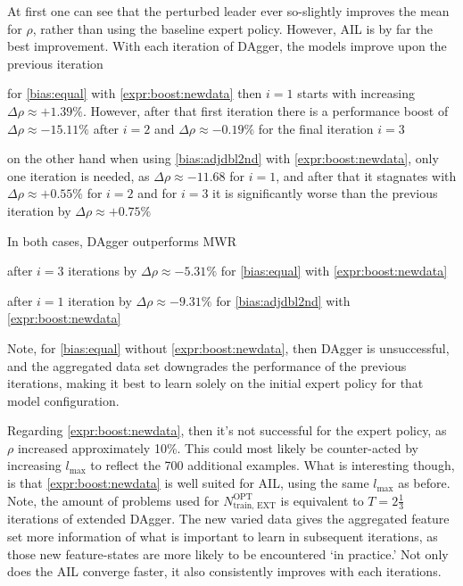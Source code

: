 \documentclass[twocolumn]{svjour3}
\begin{document}
At first one can see that the perturbed leader ever so-slightly improves the 
mean for $\rho$, rather than using the baseline expert policy. 
However, AIL is by far the best improvement. With each iteration of DAgger, the 
models improve upon the previous iteration
\begin{enumerate*} 
    \item for \ref{bias:equal} with \ref{expr:boost:newdata} then $i=1$ starts 
    with increasing $\Delta\rho\approx+1.39\%$. However, after that first  
    iteration there is a performance boost of $\Delta\rho\approx-15.11\%$ after 
    $i=2$ and $\Delta\rho\approx-0.19\%$ for the final iteration $i=3$
    \item on the other hand when using \ref{bias:adjdbl2nd} with 
    \ref{expr:boost:newdata}, only one iteration is needed, as 
    $\Delta\rho\approx-11.68$ for $i=1$, and after that it stagnates with 
    $\Delta\rho\approx+0.55\%$ for $i=2$ and for $i=3$ it is significantly 
    worse than the previous iteration by $\Delta\rho\approx+0.75\%$
\end{enumerate*}
In both cases, DAgger outperforms MWR
\begin{enumerate*}
    \item after $i=3$ iterations by $\Delta\rho\approx-5.31\%$ for 
    \ref{bias:equal} with \ref{expr:boost:newdata}
    \item after $i=1$ iteration by $\Delta\rho\approx-9.31\%$ for 
    \ref{bias:adjdbl2nd} with \ref{expr:boost:newdata}
\end{enumerate*}
Note, for \ref{bias:equal} without \ref{expr:boost:newdata}, then DAgger is 
unsuccessful, and the aggregated data set downgrades the performance of the 
previous iterations, making it best to learn solely on the initial expert 
policy for that model configuration.

Regarding \ref{expr:boost:newdata}, then it's not successful for the expert 
policy, as $\rho$ increased approximately 10\%. This could most likely be 
counter-acted by increasing $l_{\max}$ to reflect the 700 additional examples.
What is interesting though, is that \ref{expr:boost:newdata} is well suited for 
AIL, using the same $l_{\max}$ as before. 
Note, the amount of problems used for $N^{\text{OPT}}_{\text{train, EXT}}$ is
equivalent to $T=2\tfrac{1}{3}$ iterations of extended DAgger.
The new varied data gives the aggregated feature set more information 
of what is important to learn in subsequent iterations, as those new 
feature-states are more likely to be encountered `in practice.' 
Not only does the AIL converge faster, it also consistently improves with each 
iterations.
\end{document}
